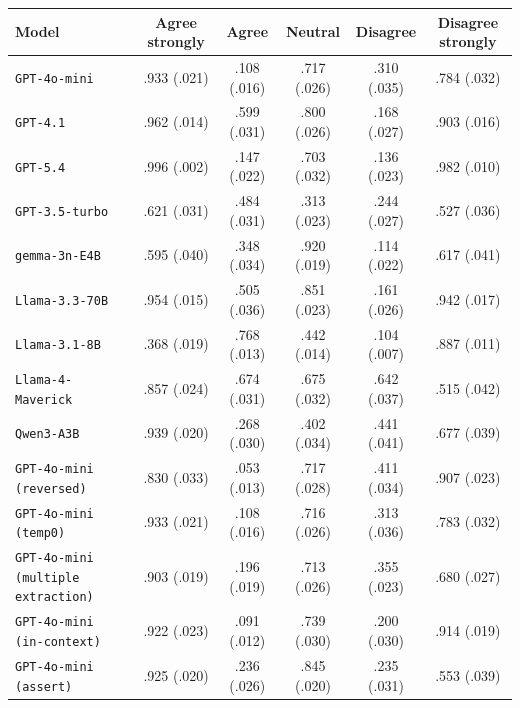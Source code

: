 \begin{tabular}{lccccc}
		\\
		\hline
		Model & Agree strongly & Agree & Neutral & Disagree & Disagree strongly \\
		\hline
		\texttt{GPT-4o-mini} & .933 (.021) & .108 (.016) & .717 (.026) & .310 (.035) & .784 (.032) \\
		\texttt{GPT-4.1} & .962 (.014) & .599 (.031) & .800 (.026) & .168 (.027) & .903 (.016) \\
		\texttt{GPT-5.4} & .996 (.002) & .147 (.022) & .703 (.032) & .136 (.023) & .982 (.010) \\
		\texttt{GPT-3.5-turbo} & .621 (.031) & .484 (.031) & .313 (.023) & .244 (.027) & .527 (.036) \\
		\texttt{gemma-3n-E4B} & .595 (.040) & .348 (.034) & .920 (.019) & .114 (.022) & .617 (.041) \\
		\texttt{Llama-3.3-70B} & .954 (.015) & .505 (.036) & .851 (.023) & .161 (.026) & .942 (.017) \\
		\texttt{Llama-3.1-8B} & .368 (.019) & .768 (.013) & .442 (.014) & .104 (.007) & .887 (.011) \\
		\texttt{Llama-4-Maverick} & .857 (.024) & .674 (.031) & .675 (.032) & .642 (.037) & .515 (.042) \\
		\texttt{Qwen3-A3B} & .939 (.020) & .268 (.030) & .402 (.034) & .441 (.041) & .677 (.039) \\
		\texttt{GPT-4o-mini (reversed)} & .830 (.033) & .053 (.013) & .717 (.028) & .411 (.034) & .907 (.023) \\
		\texttt{GPT-4o-mini (temp0)} & .933 (.021) & .108 (.016) & .716 (.026) & .313 (.036) & .783 (.032) \\
		\texttt{GPT-4o-mini (multiple extraction)} & .903 (.019) & .196 (.019) & .713 (.026) & .355 (.023) & .680 (.027) \\
		\texttt{GPT-4o-mini (in-context)} & .922 (.023) & .091 (.012) & .739 (.030) & .200 (.030) & .914 (.019) \\
		\texttt{GPT-4o-mini (assert)} & .925 (.020) & .236 (.026) & .845 (.020) & .235 (.031) & .553 (.039) \\
		\hline
\end{tabular}


